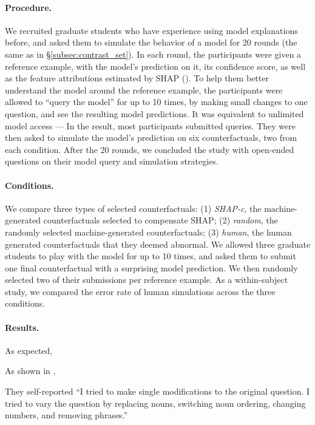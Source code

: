 \paragraph{Procedure.}
We recruited  graduate students who have experience using model explanations before, and asked them to simulate the behavior of a \qqp model for 20 rounds (the same as in \S\ref{subsec:contrast_set}).
In each round, the participants were given a reference example, with the model's prediction on it, its confidence score, as well as the feature attributions estimated by SHAP ().
To help them better understand the model around the reference example, the participants were allowed to ``query the model'' for up to 10 times, by making small changes to one question, and see the resulting model predictions.
It was equivalent to unlimited model access --- In the result, most participants submitted  queries.
They were then asked to simulate the model's prediction on six counterfactuals, two from each condition.
After the 20 rounds, we concluded the study with open-ended questions on their model query and simulation strategies.

\paragraph{Conditions.} 
We compare three types of selected counterfactuals:
(1) \emph{SHAP-c}, the machine-generated counterfactuals selected to compensate SHAP; 
(2) \emph{random}, the randomly selected machine-generated counterfactuals; 
(3) \emph{human}, 
the human generated counterfactuals that they deemed abnormal.
We allowed three graduate students to play with the model for up to 10 times, and asked them to submit one final counterfactual with a surprising model prediction.
We then randomly selected two of their submissions per reference example.
As a within-subject study, we compared the error rate of human simulations across the three conditions.


\paragraph{Results.}
As expected, 

As shown in , 

They self-reported 
``I tried to make single modifications to the original question. I tried to vary the question by replacing nouns, switching noun ordering, changing numbers, and removing phrases.''

